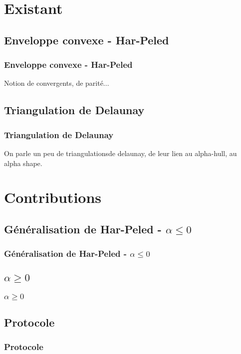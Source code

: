 \documentclass{beamer}
\begin{document}
\section{Existant} 

\subsection{Enveloppe convexe - Har-Peled} 
\begin{frame}
\frametitle{Enveloppe convexe - Har-Peled}
Notion de convergents, de parité...
\end{frame}

\subsection{Triangulation de Delaunay}  %
\begin{frame}
\frametitle{Triangulation de Delaunay}
On parle un peu de triangulationsde delaunay, de leur lien au alpha-hull, au alpha shape.
\end{frame}

\section{Contributions} 

\subsection{Généralisation de Har-Peled - $\alpha \leq 0$} 
\begin{frame}
\frametitle{Généralisation de Har-Peled - $\alpha \leq 0$}

\end{frame}

\subsection{$\alpha \geq 0$} 
\begin{frame}
\frametitle{$\alpha \geq 0$}
\end{frame}

\subsection{Protocole} 
\begin{frame}
\frametitle{Protocole}
\end{frame}
\end{document}
